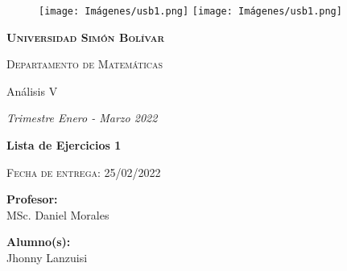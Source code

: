 \thispagestyle{empty}
           \begin{figure}[ht]
                \texttt{[image: Imágenes/usb1.png]}
           \endminipage
                \texttt{[image: Imágenes/usb1.png]}
            \endminipage
        \end{figure}
        
        \vspace{0.1cm}
        
        \begin{center}
            {\scshape\LARGE \textbf{Universidad Simón Bolívar} \par}
            {\scshape\Large Departamento de Matemáticas\par}
            
             {\LARGE Análisis V}

            \begin{center}
            
            {\LARGE \textit{Trimestre Enero - Marzo 2022}}

            
            {\LARGE\bfseries Lista de Ejercicios 1\par}

        {\scshape\Large Fecha de entrega: 25/02/2022\par}   

                    \LARGE  { \textbf{Profesor:}}\\%
        \large      { MSc. Daniel Morales}
        
        \vspace{-0.5cm} 
        
        \LARGE  { \textbf{Alumno(s):}}\\%

        \normalsize  {Jhonny Lanzuisi}
           \end{center}
        \end{center}
